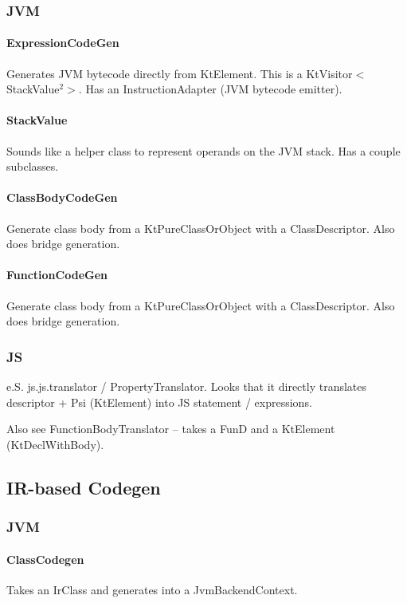 \documentclass{article}
\begin{document}
\subsubsection{JVM}

\paragraph{ExpressionCodeGen}
Generates JVM bytecode directly from KtElement. This is a KtVisitor$<$StackValue$^2$$>$. Has an InstructionAdapter (JVM bytecode emitter).

\paragraph{StackValue}
Sounds like a helper class to represent operands on the JVM stack. Has a couple subclasses.

\paragraph{ClassBodyCodeGen}
Generate class body from a KtPureClassOrObject with a ClassDescriptor. Also does bridge generation.

\paragraph{FunctionCodeGen}
Generate class body from a KtPureClassOrObject with a ClassDescriptor. Also does bridge generation.

\subsubsection{JS}

e.S. js.js.translator / PropertyTranslator. Looks that it directly translates descriptor + Psi (KtElement) into JS statement / expressions.

Also see FunctionBodyTranslator -- takes a FunD and a KtElement (KtDeclWithBody).

\subsection{IR-based Codegen}

\subsubsection{JVM}

\paragraph{ClassCodegen}
Takes an IrClass and generates into a JvmBackendContext.
\end{document}
